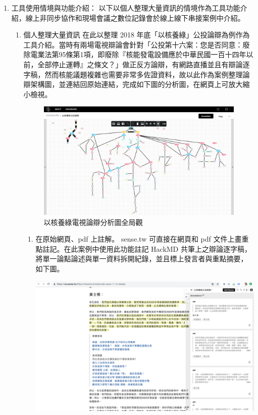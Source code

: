 \documentclass[12pt,a4paper]{article}
\begin{document}
\begin{enumerate}
\item 工具使用情境與功能介紹：
\label{sec:org5e8d741}
以下以個人整理大量資訊的情境作為工具功能介紹，線上非同步協作和現場會議之數位記錄會於線上線下串接案例中介紹。
\begin{enumerate}
\item 個人整理大量資訊
\label{sec:orgdbffb59}
在此以整理 2018 年底「以核養綠」公投論辯為例作為工具介紹。當時有兩場電視辯論會針對「公投第十六案：您是否同意：廢除電業法第95條第1項，即廢除『核能發電設備應於中華民國一百十四年以前，全部停止運轉』之條文？」做正反方論辯，有網路直播並且有辯論逐字稿，然而核能議題複雜也需要非常多佐證資料，故以此作為案例整理論辯架構圖，並連結回原始連結，完成如下圖的分析圖，在網頁上可放大縮小檢視。

\begin{figure}[htbp]
\centering
\includegraphics[width=.9\linewidth]{./images/nuclear_whole_picture.png}
\caption{\label{fig:orgb2473c3}
以核養綠電視論辯分析圖全局觀}
\end{figure}
\begin{enumerate}
\item 在原始網頁、pdf 上註解。
\label{sec:org7efcc87}
sense.tw 可直接在網頁和 pdf 文件上畫重點註記。在此案例中使用此功能註記 HackMD 共筆上之辯論逐字稿，將單一論點論述與單一資料拆開紀錄，並且標上發言者與重點摘要，如下圖。

\begin{center}
\includegraphics[width=.9\linewidth]{./images/nuclear_annotation_hackmd.png}
\end{center}


\end{enumerate}
\end{enumerate}
\end{enumerate}
\end{document}
